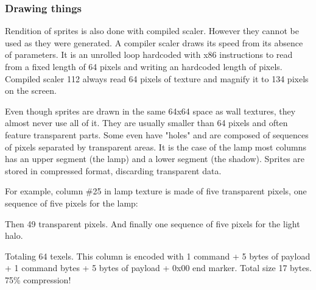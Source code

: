 \subsubsection{Drawing things}
Rendition of sprites is also done with compiled scaler. However they cannot be used as they were generated. A compiler scaler draws its speed from its absence of parameters. It is  an unrolled loop hardcoded with x86 instructions to read from a fixed length of 64 pixels and writing an hardcoded length of pixels. Compiled scaler 112 always read 64 pixels of texture and magnify it to 134 pixels on the screen.\\
\par
\par
Even though sprites are drawn in the same 64x64 space as wall textures, they almost never use all of it. They are usually smaller than 64 pixels and often feature transparent parts. Some even have "holes" and are composed of sequences of pixels separated by transparent areas. It is the case of the lamp most columns has an upper segment (the lamp) and a lower segment (the shadow). Sprites are stored in compressed format, discarding transparent data.\\
\par

\begin{minipage}{.5\textwidth}
For example, column \#25 in lamp texture is made of five transparent pixels, one sequence of five pixels for the lamp:\\
\par
{}
\par
Then 49 transparent pixels. And finally one sequence of five pixels for the light halo.\\
\par
{}
\par
Totaling 64 texels. This column is encoded with 1 command + 5 bytes of payload + 1 command bytes + 5 bytes of payload + 0x00 end marker. Total size 17 bytes. 75\% compression!\\
 \end{minipage}
\begin{minipage}{.5\textwidth}
\begin{figure}[H]
  \begin{flushright}
   \end{flushright}
\end{figure}
\end{minipage}



